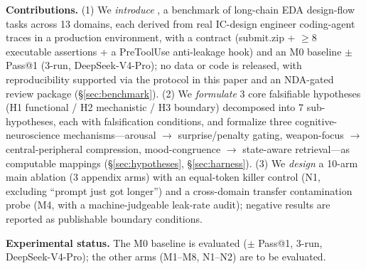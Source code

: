 \textbf{Contributions.} (1) We \emph{introduce} \bench{}, a benchmark of \Ncases{} long-chain EDA design-flow tasks across 13 domains, each derived from real IC-design engineer coding-agent traces in a production environment, with a \mode{} contract (submit.zip + $\geq$8 executable assertions + a PreToolUse anti-leakage hook) and an M0 baseline \MzeroPass{}$\pm$\MzeroStd{} Pass@1 (3-run, DeepSeek-V4-Pro); no data or code is released, with reproducibility supported via the protocol in this paper and an NDA-gated review package (\S\ref{sec:benchmark}). (2) We \emph{formulate} 3 core falsifiable hypotheses (H1 functional / H2 mechanistic / H3 boundary) decomposed into 7 sub-hypotheses, each with falsification conditions, and formalize three cognitive-neuroscience mechanisms---arousal $\rightarrow$ surprise/penalty gating, weapon-focus $\rightarrow$ central-peripheral compression, mood-congruence $\rightarrow$ state-aware retrieval---as computable mappings (\S\ref{sec:hypotheses}, \S\ref{sec:harness}). (3) We \emph{design} a 10-arm main ablation (3 appendix arms) with an equal-token killer control (N1, excluding ``prompt just got longer'') and a cross-domain transfer contamination probe (M4, with a machine-judgeable leak-rate audit); negative results are reported as publishable boundary conditions.

\textbf{Experimental status.} The M0 baseline is evaluated (\MzeroPass{}$\pm$\MzeroStd{} Pass@1, 3-run, DeepSeek-V4-Pro); the other arms (M1--M8, N1--N2) are to be evaluated.
